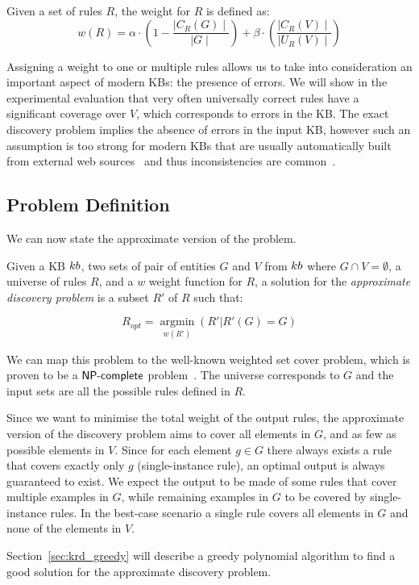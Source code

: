 \begin{definition}
	Given a set of rules $R$, the weight for $R$ is defined as:
	\begin{equation*}
	w(R) = \alpha \cdot (1-\frac{\mid C_{R}(G)\mid}{\mid G \mid}) +\beta \cdot (\frac{\mid C_{R}(V) \mid}{\mid U_{R}(V)\mid})
	\end{equation*}
\end{definition}

Assigning a weight to one or multiple rules allows us to take into consideration an important aspect of modern KBs: the presence of errors. We will show in the experimental evaluation that very often universally correct rules have a significant coverage over $V$, which corresponds to errors in the KB. The exact discovery problem implies the absence of errors in the input KB, however such an assumption is too strong for modern KBs that are usually automatically built from external web sources~\cite{dong2014knowledge,shin2015incremental,suchanek2007yago} and thus inconsistencies are common~\cite{suchanek2009sofie}.


\subsection{Problem Definition} \label{sec:krd_prob_def}
We can now state the approximate version of the problem.

\begin{definition}
	Given a KB ${\sc kb}$, two sets of pair of entities $G$ and $V$ from ${\sc kb}$ where $G \cap V = \emptyset$, a universe of rules $R$, and a $w$ weight function for $R$,
	a solution for the \emph{approximate discovery problem} is a subset $R'$ of $R$  such that:
	
	$$R_{opt}=\underset{w(R')}{\operatorname{argmin}}(R'|R'(G) = G)$$
\end{definition}


We can map this problem to the well-known weighted set cover problem, which is proven to be a $\textsf{NP\mbox{-}complete}$ problem~\cite{chvatal1979greedy}. The universe corresponds to $G$ and the input sets are all the possible rules defined in $R$.

Since we want to minimise the total weight of the output rules, the approximate version of the discovery problem aims to cover all elements in $G$, and as few as possible elements in $V$. Since for each element $g \in G$ there always exists a rule that covers exactly only $g$ (single-instance rule), an optimal output is always guaranteed to exist. We expect the output to be made of some rules that cover multiple examples in $G$, while remaining examples in $G$ to be covered by single-instance rules. In the best-case scenario a single rule covers all elements in $G$ and none of the elements in $V$.

Section~\ref{sec:krd_greedy} will describe a greedy polynomial algorithm to find a good solution for the approximate discovery problem.

